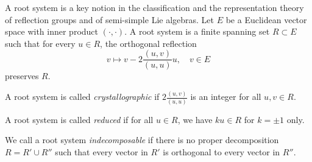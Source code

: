 \documentclass[12pt]{article}
\begin{document}
A root system is a key notion in the classification and the
representation theory of reflection groups and of semi-simple Lie
algebras.  Let $E$ be a Euclidean vector space with inner product
$(\cdot,\cdot)$. A root system is a finite spanning set $R\subset E$
such that for every $u\in R$, the orthogonal reflection $$v\mapsto
v-2\frac{(u,v)}{(u,u)} u,\quad v\in E$$
preserves $R$.

A root system is called \emph{crystallographic} if
$2\frac{(u,v)}{(u,u)}$ is an integer for all $u,v\in R$.

A root system is called {\em reduced} if for all $u\in R$, we have
$ku\in R$ for $k=\pm 1$ only.

We call a root system {\em indecomposable} if there is no proper
decomposition $R=R'\cup R''$ such that every vector in $R'$ is orthogonal to
every vector in $R''$.
\end{document}
